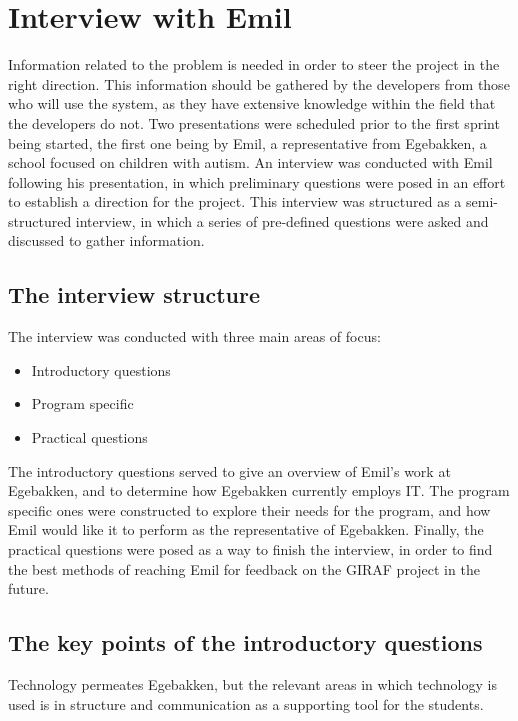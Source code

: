 \section{Interview with Emil}
Information related to the problem is needed in order to steer the project in the right direction.
This information should be gathered by the developers from those who will use the system, as they have extensive knowledge within the field that the developers do not.
Two presentations were scheduled prior to the first sprint being started, the first one being by Emil, a representative from Egebakken, a school focused on children with autism.
An interview was conducted with Emil following his presentation, in which preliminary questions were posed in an effort to establish a direction for the project.
This interview was structured as a semi-structured interview, in which a series of pre-defined questions were asked and discussed to gather information.

\subsection{The interview structure}
The interview was conducted with three main areas of focus:
\begin{itemize}
    \item Introductory questions
    \item Program specific
    \item Practical questions
\end{itemize}
\noindent
The introductory questions served to give an overview of Emil's work at Egebakken, and to determine how Egebakken currently employs IT.
The program specific ones were constructed to explore their needs for the program, and how Emil would like it to perform as the representative of Egebakken.
Finally, the practical questions were posed as a way to finish the interview, in order to find the best methods of reaching Emil for feedback on the GIRAF project in the future.

\subsection{The key points of the introductory questions}
Technology permeates Egebakken, but the relevant areas in which technology is used is in structure and communication as a supporting tool for the students.

